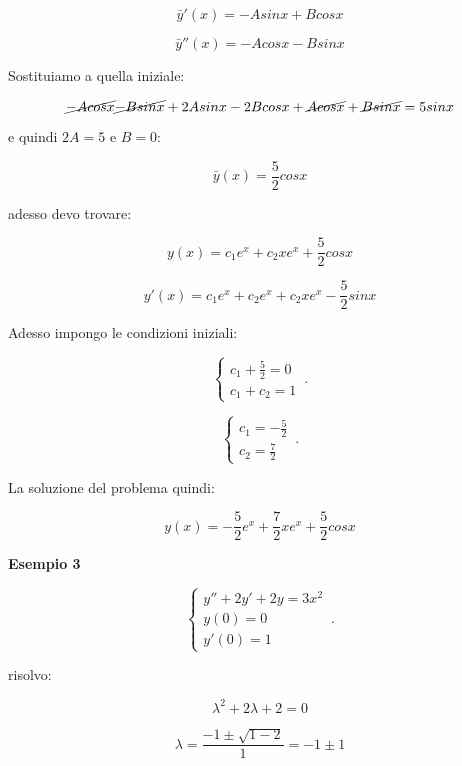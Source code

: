 \documentclass[../appunti-analisi.tex]{subfiles}
\begin{document}
\[
    \bar{y} '(x)  = -A sinx + B cosx
\]

\[
    \bar{y} ''(x)  = -A cosx - B sinx
\]
    

Sostituiamo a quella iniziale:

\[
    \cancel{-A cosx} \cancel{- Bsinx} + 2A sinx - 2B cosx+ \cancel{A cosx} + \cancel{Bsinx} = 5sinx
\]

e quindi $2A = 5$ e $B=0$:

\[
    \bar{y} (x) = \frac{5}{2} cosx
\]

adesso devo trovare:

\[
    y(x) = c_1 e ^{x}+ c_2 x e ^{x} + \frac{5}{2} cosx
\]

\[
    y'(x)  = c_1 e ^{x} + c_2 e ^{x} + c_2x e ^{x} - \frac{5}{2}sinx
\]

Adesso impongo le condizioni iniziali:

    \begin{equation}
        \begin{cases}
            c_1 +\frac{5}{2}=0\\
            c_1+c_2= 1
        \end{cases}\,.
    \end{equation}

    \begin{equation}
        \begin{cases}
            c_1 = -\frac{5}{2}\\
            c_2 = \frac{7}{2}
        \end{cases}\,.
    \end{equation}

La soluzione del problema quindi:

\[
    y(x) = -\frac{5}{2}e ^{x}+ \frac{7}{2} x e ^{x} + \frac{5}{2} cosx
\]

\textbf{Esempio 3} 

    \begin{equation}
        \begin{cases}
            y''+ 2y'+ 2y= 3x^{2}\\
            y(0) = 0\\
            y'(0) = 1
        \end{cases}\,.
    \end{equation}


risolvo:

\[
    \lambda^{2}+2 \lambda+2 =0
\]

\[
    \lambda= \frac{-1 \pm \sqrt{1-2}}{1}= -1 \pm 1
\]
\end{document}
